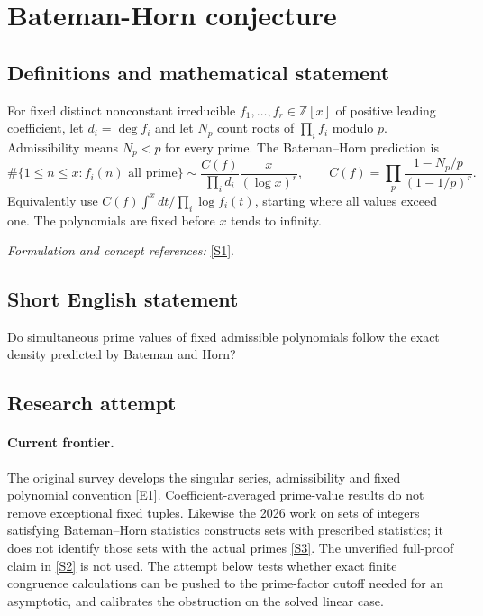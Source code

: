 \documentclass[11pt,a4paper]{article}
\numberwithin{equation}{section}
\newcommand{\Z}{\mathbb{Z}}
\newcommand{\sref}[2]{\hyperlink{source:#1:#2}{[S#2]}}
\newcommand{\eref}[2]{\hyperlink{extra:#1:#2}{[E#2]}}
\newif\ifshowcatalogue
\newcommand{\cataloguescope}[1]{\ifshowcatalogue
 \paragraph{Exact scope in the supplied catalogue.}
 \begin{quote}\small #1\end{quote}\fi}
\begin{document}
\setcounter{section}{0}
\section*{\texorpdfstring{Bateman-Horn conjecture}{Bateman-Horn conjecture}}\label{30006717}
\subsection{Definitions and mathematical statement}
For fixed distinct nonconstant irreducible $f_1,\ldots,f_r\in\Z[x]$ of positive leading coefficient, let $d_i=\deg f_i$ and let $N_p$ count roots of $\prod_i f_i$ modulo $p$. Admissibility means $N_p<p$ for every prime. The Bateman--Horn prediction is
\[
 \#\{1\le n\le x:f_i(n)\text{ all prime}\}
 \sim\frac{C(f)}{\prod_i d_i}\frac{x}{(\log x)^r},\qquad
 C(f)=\prod_p\frac{1-N_p/p}{(1-1/p)^r}.
\]
Equivalently use $C(f)\int^x dt/\prod_i\log f_i(t)$, starting where all values exceed one. The polynomials are fixed before $x$ tends to infinity.
\par\smallskip\textit{Formulation and concept references:} \sref{30006717}{1}.
\cataloguescope{Prove or disprove the Bateman-Horn asymptotic formula for the number of positive integers n up to x for which any fixed admissible finite family of distinct irreducible integer polynomials with positive leading coefficients are simultaneously prime.}
\subsection{Short English statement}
Do simultaneous prime values of fixed admissible polynomials follow the exact density predicted by Bateman and Horn?
\subsection{Research attempt}

\paragraph{Current frontier.}
The original survey develops the singular series, admissibility and fixed
polynomial convention \eref{30006717}{1}. Coefficient-averaged prime-value
results do not remove exceptional fixed tuples. Likewise the 2026 work
on sets of integers satisfying Bateman--Horn statistics constructs sets
with prescribed statistics; it does not identify those sets with the
actual primes \sref{30006717}{3}. The unverified full-proof claim in
\sref{30006717}{2} is not used. The attempt below tests whether exact finite
congruence calculations can be pushed to the prime-factor cutoff needed
for an asymptotic, and calibrates the obstruction on the solved linear case.
\end{document}
